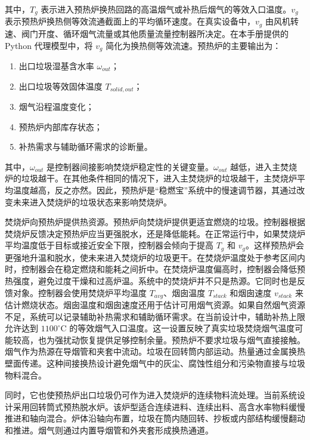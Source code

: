 \documentclass[UTF8,openany,zihao=-4,oneside]{ctexbook}
\providecommand{\tightlist}{\setlength{\itemsep}{0pt}\setlength{\parskip}{0pt}}
\begin{document}
其中，\(T_g\) 表示进入预热炉换热回路的高温烟气或补热后烟气的等效入口温度。\(v_g\) 表示预热炉换热侧等效流通截面上的平均循环速度。在真实设备中，\(v_g\) 由风机转速、阀门开度、循环烟气流量或其他质量流量控制器所决定。在本手册提供的 Python 代理模型中，将 \(v_g\) 简化为换热侧等效流速。预热炉的主要输出为：

\begin{enumerate}
\def\labelenumi{\arabic{enumi}.}
\tightlist
\item
  出口垃圾湿基含水率 \(\omega_{out}\)；
\item
  出口垃圾等效固体温度 \(T_{solid,out}\)；
\item
  烟气沿程温度变化；
\item
  预热炉内部库存状态；
\item
  补热需求与辅助循环需求的诊断量。
\end{enumerate}

其中，\(\omega_{out}\) 是控制器间接影响焚烧炉稳定性的关键变量。\(\omega_{out}\) 越低，进入主焚烧炉的垃圾越干。在其他条件相同的情况下，进入主焚烧炉的垃圾越干，主焚烧炉平均温度越高，反之亦然。因此，预热炉是``稳燃宝''系统中的慢速调节器，其通过改变未来进入焚烧炉的垃圾状态来影响焚烧炉。

焚烧炉向预热炉提供热资源。预热炉向焚烧炉提供更适宜燃烧的垃圾。控制器根据焚烧炉反馈决定预热炉应当更强脱水，还是降低能耗。在正常运行中，如果焚烧炉平均温度低于目标或接近安全下限，控制器会倾向于提高 \(T_g\) 和 \(v_g\)。这样预热炉会更强地升温和脱水，使未来进入焚烧炉的垃圾更干。在焚烧炉温度处于参考区间内时，控制器会在稳定燃烧和能耗之间折中。在焚烧炉温度偏高时，控制器会降低预热强度，避免过度干燥和过高炉温。系统中的焚烧炉并不只是热源。它同时也是反馈对象。控制器会使用焚烧炉平均温度 \(T_{avg}\)、烟囱温度 \(T_{stack}\) 和烟囱速度 \(v_{stack}\) 来估计燃烧状态。烟囱温度和烟囱速度还用于估计可用烟气资源。如果自然烟气资源不足，系统可以记录辅助补热需求和辅助循环需求。在当前设计中，辅助补热上限允许达到 \(1100^\circ\mathrm{C}\) 的等效烟气入口温度。这一设置反映了真实垃圾焚烧烟气温度可能较高，也为强扰动恢复提供足够控制余量。预热炉不要求垃圾与烟气直接接触。烟气作为热源在导烟管和夹套中流动。垃圾在回转筒内部运动。热量通过金属换热壁面传递。这种间接换热设计避免烟气中的灰尘、腐蚀性组分和污染物直接与垃圾物料混合。

同时，它也使预热炉出口垃圾仍可作为进入焚烧炉的连续物料流处理。当前系统设计采用回转筒式预热脱水炉。该炉型适合连续进料、连续出料、高含水率物料缓慢推进和轴向混合。炉体沿轴向布置，垃圾在筒内随回转、抄板或内部结构缓慢翻动和推进。烟气则通过内置导烟管和外夹套形成换热通道。
\end{document}
